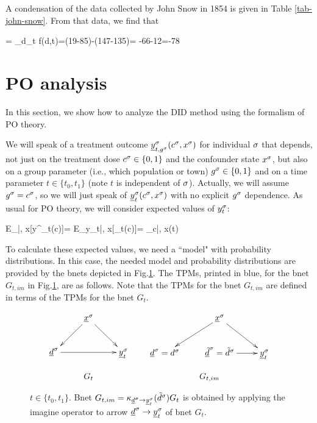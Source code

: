 A condensation of the
data collected by John Snow in 1854
is given in Table \ref{tab-john-snow}.
From that data, we find that

\beq
\delta= \Delta_d\Delta_t f(d,t)=(19-85)-(147-135)=
-66-12=-78
\eeq



\section{PO analysis}
In this section,
we show how
to analyze the
DID method
using the formalism of PO theory.

We will speak of a treatment 
outcome
${\underline{y}}^\sigma_{t, g^\sigma}
(c^\sigma, x^\sigma)$
for individual $\sigma$
that depends, not 
just on the treatment dose 
$c^\sigma\in \{0,1\}$
and the confounder state $x^\sigma$,
but also
on a group parameter (i.e., which population
or town)
$g^\sigma\in \{0,1\}$
and on a time parameter $t\in\{t_0, t_1\}$ 
(note $t$ is independent of $\sigma$).
Actually,
we will assume $g^\sigma=c^\sigma$,
so we will just speak of
${\underline{y}}^\sigma_t(c^\sigma, x^\sigma)$
with no explicit $g^\sigma$
dependence. As usual for PO theory,
we will consider
expected values of $y^\sigma_t$:


\beq
E_{\s|\td, x}[y^\s_t(c)]=
 E_{y_t|\td, x}[\rvy_t(c)]=
\caly_{c|\td, x}(t)
\eeq

To calculate these
expected values, we need a ``model"
with probability 
distributions.
In this case,
the needed model and probability
distributions are
provided by the
bnets depicted in Fig.\ref{fig-did-G_t-im}.
The TPMs,
printed in blue,
for the 
 bnet
$G_{t, im}$
in Fig.\ref{fig-did-G_t-im},
are as follows.
Note
that the
TPMs for the bnet $G_{t, im}$
are defined in 
terms
of the TPMs for the bnet $G_t$.


\begin{figure}[h!]
$$
\begin{array}{ccccc}
\xymatrix{
&\rvx^\s\ar[dl]\ar[dr]
\\
\rvd^\s\ar[rr]&&\rvy^\s_t
}
&&
\xymatrix{
&\rvx^\s\ar[dl]\ar[dr]
\\
\rvd^\s=d^\s&\rvtd^\s=\td^\s\ar[r]&\rvy^\s_t
}
\\
\\
G_t&&G_{t, im}
\end{array}
$$
\caption{$t\in \{t_0, t_1\}$.
Bnet 
$G_{t, im}= \kappa_{{\underline{d}}^\sigma\rightarrow{\underline{y}}^\sigma_t}
({\tilde{d}}^\sigma)G_t$
is obtained by applying 
the imagine operator to arrow 
${\underline{d}}^\sigma\rightarrow{\underline{y}}^\sigma_t$
of bnet $G_t$.}
\label{fig-did-G_t-im}
\end{figure}

